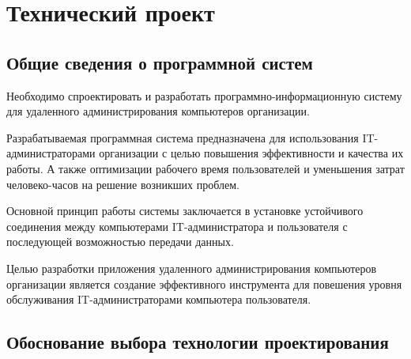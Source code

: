 \newsection
\section{Технический проект}
\subsection{Общие сведения о программной систем}

Необходимо спроектировать и разработать программно-информационную систему для удаленного администрирования компьютеров организации.

Разрабатываемая программная система предназначена для использования IT-администраторами организации с целью повышения эффективности и качества их работы. А также оптимизации рабочего время пользователей и уменьшения затрат человеко-часов на решение возникших проблем.

Основной принцип работы системы заключается в установке устойчивого соединения между компьютерами IT-администратора и пользователя с последующей возможностью передачи данных. 

Целью разработки приложения удаленного администрирования компьютеров организации  является создание эффективного инструмента для повешения уровня обслуживания IT-администраторами компьютера пользователя.


\subsection{Обоснование выбора технологии проектирования}

